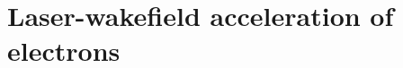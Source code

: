 \documentclass[10pt, a4paper, twoside, openright]{report}
\begin{document}
\section{Laser-wakefield acceleration of electrons\label{sec:lwfa}}
%

%

%

%

%

%

%

%

%

\end{document}
